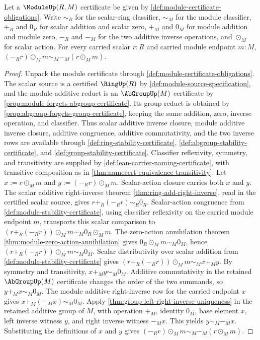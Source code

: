 \begin{lemma}\label{lem:module-scalar-additive-inverse-action}
Let a $\ModuleUp(R,M)$ certificate be given by \autoref{def:module-certificate-obligations}. Write $\sim_R$ for the scalar-ring classifier, $\sim_M$ for the module classifier, $+_R$ and $0_R$ for scalar addition and scalar zero, $+_M$ and $0_M$ for module addition and module zero, $-_R$ and $-_M$ for the two additive inverse operations, and $\odot_M$ for scalar action. For every carried scalar $r:R$ and carried module endpoint $m:M$, $(-_R r)\odot_M m\sim_M -_M(r\odot_M m)$.
\end{lemma}
\begin{proof}
Unpack the module certificate through \autoref{def:module-certificate-obligations}. The scalar source is a certified $\RingUp(R)$ by \autoref{def:module-source-specification}, and the module additive reduct is an $\AbGroupUp(M)$ certificate by \autoref{prop:module-forgets-abgroup-certificate}. Its group reduct is obtained by \autoref{prop:abgroup-forgets-group-certificate}, keeping the same addition, zero, inverse operation, and classifier. Thus scalar additive inverse closure, module additive inverse closure, additive congruence, additive commutativity, and the two inverse rows are available through \autoref{def:ring-stability-certificate}, \autoref{def:abgroup-stability-certificate}, and \autoref{def:group-stability-certificate}. Classifier reflexivity, symmetry, and transitivity are supplied by \autoref{def:lean-carrier-naming-certificate}, with transitive composition as in \autoref{thm:namecert-equivalence-transitivity}.
Let $x:=r\odot_M m$ and $y:=(-_R r)\odot_M m$. Scalar-action closure carries both $x$ and $y$. The scalar additive right-inverse theorem \autoref{thm:ring-add-right-inverse}, read in the certified scalar source, gives $r+_R(-_R r)\sim_R0_R$.
Scalar-action congruence from \autoref{def:module-stability-certificate}, using classifier reflexivity on the carried module endpoint $m$, transports this scalar comparison to $(r+_R(-_R r))\odot_M m\sim_M0_R\odot_M m$. The zero-action annihilation theorem \autoref{thm:module-zero-action-annihilation} gives $0_R\odot_M m\sim_M0_M$, hence $(r+_R(-_R r))\odot_M m\sim_M0_M$.
Scalar distributivity over scalar addition from \autoref{def:module-stability-certificate} gives $(r+_R(-_R r))\odot_M m\sim_M x+_M y$. By symmetry and transitivity, $x+_M y\sim_M0_M$. Additive commutativity in the retained $\AbGroupUp(M)$ certificate changes the order of the two summands, so $y+_M x\sim_M0_M$.
The module additive right-inverse row for the carried endpoint $x$ gives $x+_M(-_M x)\sim_M0_M$. Apply \autoref{thm:group-left-right-inverse-uniqueness} in the retained additive group of $M$, with operation $+_M$, identity $0_M$, base element $x$, left inverse witness $y$, and right inverse witness $-_M x$. This yields $y\sim_M-_M x$.
Substituting the definitions of $x$ and $y$ gives $(-_R r)\odot_M m\sim_M -_M(r\odot_M m)$.
\end{proof}

